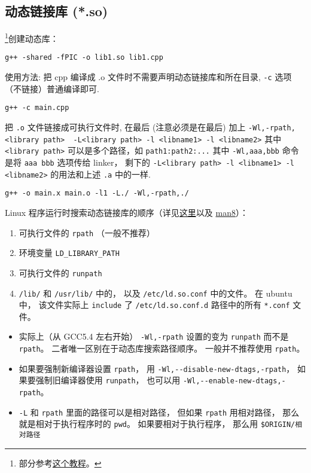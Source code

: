 \subsection{动态链接库 (*.so)}
\footnote{部分参考\href{https://amir.rachum.com/blog/2016/09/17/shared-libraries/}{这个教程}。}创建动态库：
\begin{lstlisting}[language=none]
g++ -shared -fPIC -o lib1.so lib1.cpp
\end{lstlisting}

使用方法:
把 cpp 编译成 .o 文件时不需要声明动态链接库和所在目录, \verb`-c` 选项（不链接）普通编译即可.
\begin{lstlisting}[language=none]
g++ -c main.cpp
\end{lstlisting}
把 \verb|.o| 文件链接成可执行文件时, 在最后 (注意必须是在最后) 加上
\verb`-Wl,-rpath,<library path>  -L<library path> -l <libname1> -l <libname2>` 其中 \verb|<library path>| 可以是多个路径，如 \verb|path1:path2:...|
其中 \verb`-Wl,aaa,bbb` 命令是将 \verb`aaa bbb` 选项传给 linker， 剩下的 \verb`-L<library path> -l <libname1> -l <libname2>` 的用法和上述 \verb|.a| 中的一样.

\begin{lstlisting}[language=none]
g++ -o main.x main.o -l1 -L./ -Wl,-rpath,./
\end{lstlisting}

Linux 程序运行时搜索动态链接库的顺序（详见\href{https://unix.stackexchange.com/questions/22926/where-do-executables-look-for-shared-objects-at-runtime}{这里}以及 \href{https://man7.org/linux/man-pages/man8/ld.so.8.html}{man8}）：
\begin{enumerate}
\item 可执行文件的 \verb|rpath| （一般不推荐）
\item 环境变量 \verb|LD_LIBRARY_PATH|
\item 可执行文件的 \verb|runpath|
\item \verb|/lib/| 和 \verb|/usr/lib/| 中的， 以及 \verb|/etc/ld.so.conf| 中的文件。 在 ubuntu 中， 该文件实际上 \verb|include| 了 \verb|/etc/ld.so.conf.d| 路径中的所有 \verb|*.conf| 文件。
\end{enumerate}

\begin{itemize}
\item 实际上（从 GCC5.4 左右开始） \verb|-Wl,-rpath| 设置的变为 \verb|runpath| 而不是 \verb|rpath|。 二者唯一区别在于动态库搜索路径顺序。 一般并不推荐使用 \verb|rpath|。
\item 如果要强制新编译器设置 \verb|rpath|， 用 \verb|-Wl,--disable-new-dtags,-rpath|， 如果要强制旧编译器使用 \verb|runpath|， 也可以用 \verb|-Wl,--enable-new-dtags,-rpath|。
\item \verb|-L| 和 \verb|rpath| 里面的路径可以是相对路径， 但如果 \verb|rpath| 用相对路径， 那么就是相对于执行程序时的 \verb|pwd|。 如果要相对于执行程序， 那么用 \verb|$ORIGIN/相对路径|
\end{itemize}

